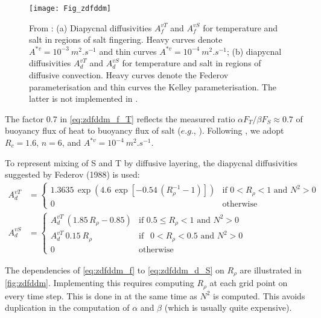 \documentclass[../main/NEMO_manual]{subfiles}
\begin{document}
\begin{figure}[!t]
  \begin{center}
    \texttt{[image: Fig\_zdfddm]}
    \caption{
      \protect\label{fig:zdfddm}
      From \citet{Merryfield1999} :
      (a) Diapycnal diffusivities $A_f^{vT}$ and $A_f^{vS}$ for temperature and salt in regions of salt fingering.
      Heavy curves denote $A^{\ast v} = 10^{-3}~m^2.s^{-1}$ and thin curves $A^{\ast v} = 10^{-4}~m^2.s^{-1}$;
      (b) diapycnal diffusivities $A_d^{vT}$ and $A_d^{vS}$ for temperature and salt in regions of
      diffusive convection.
      Heavy curves denote the Federov parameterisation and thin curves the Kelley parameterisation.
      The latter is not implemented in \NEMO.
    }
  \end{center}
\end{figure}

The factor 0.7 in \autoref{eq:zdfddm_f_T} reflects the measured ratio $\alpha F_T /\beta F_S \approx  0.7$ of
buoyancy flux of heat to buoyancy flux of salt ($e.g.$, \citet{McDougall_Taylor_JMR84}).
Following  \citet{Merryfield1999}, we adopt $R_c = 1.6$, $n = 6$, and $A^{\ast v} = 10^{-4}~m^2.s^{-1}$.

To represent mixing of S and T by diffusive layering,  the diapycnal diffusivities suggested by
Federov (1988) is used: 
\begin{align}
  A_d^{vT} &=
             \begin{cases}
               1.3635 \, \exp{\left( 4.6\, \exp{ \left[  -0.54\,( R_{\rho}^{-1} - 1 )  \right] }    \right)}
               &\text{if  $0<R_\rho < 1$ and $N^2>0$ } \\
               0 								&\text{otherwise}
             \end{cases}
                                       \nonumber \\
  \label{eq:zdfddm_d_S}
  A_d^{vS} &=
             \begin{cases}
               A_d^{vT}\ \left( 1.85\,R_{\rho} - 0.85 \right) &\text{if  $0.5 \leq R_\rho<1$ and $N^2>0$ } \\
               A_d^{vT} \ 0.15 \ R_\rho               &\text{if  $\ \ 0 < R_\rho<0.5$ and $N^2>0$ } \\
               0 								&\text{otherwise}
             \end{cases}
\end{align}

The dependencies of \autoref{eq:zdfddm_f} to \autoref{eq:zdfddm_d_S} on $R_\rho$ are illustrated in
\autoref{fig:zdfddm}.
Implementing this requires computing $R_\rho$ at each grid point on every time step.
This is done in  at the same time as $N^2$ is computed.
This avoids duplication in the computation of $\alpha$ and $\beta$ (which is usually quite expensive).
\end{document}
